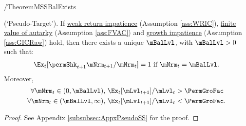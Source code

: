 \documentclass[\econtexRoot/BufferStockTheory]{subfiles}
\begin{document}
\begin{verbatimwrite}{\EqDir/TheoremMSSBalExists}
  \begin{theorem}(`Pseudo-Target').
If \hyperlink{WRIC}{weak return impatience} (Assumption \ref{ass:WRIC}), \hyperlink{FVAC}{finite value of autarky} (Assumption \ref{ass:FVAC}) and \hyperlink{GICRaw}{growth impatience} (Assumption \ref{ass:GICRaw}) hold, then there exists a unique $\mBalLvl$, with $\mBalLvl>0$ such that:
    \begin{equation}
      \Ex_t [\permShk_{t+1}{\mNrm}_{t+1}/\mNrm_t] = 1 \mbox{~if~} \mNrm_t = \mBalLvl.
      \label{eq:mBalLvl}
    \end{equation}
    Moreover,
    \begin{equation}
      \label{eq:stabilityStE}
      \begin{aligned}
        \forall {\mNrm}_t\in(0,\mBalLvl),      \,\,& \Ex_{t}[\mLvl_{t+1}]/\mLvl_{t} > \PermGroFac \\
        \forall {\mNrm}_t\in(\mBalLvl,\infty), \,\,& \Ex_{t}[\mLvl_{t+1}]/\mLvl_{t} < \PermGroFac.
      \end{aligned}
    \end{equation}
  \end{theorem}
\end{verbatimwrite} \unskip

\begin{proof}
See Appendix \ref{subsubsec:AppxPseudoSS} for the proof.

\end{proof}

\end{document}

